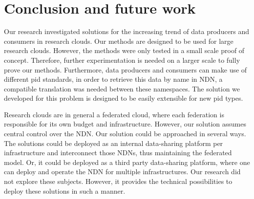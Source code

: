\section{Conclusion and future work}
\label{fut}
\label{conc}












Our research investigated solutions for the increasing trend of data producers and consumers in research clouds. Our methods are designed to be used for large research clouds. However, the methods were only tested in a small scale proof of concept. Therefore, further experimentation is needed on a larger scale to fully prove our methods. Furthermore, data producers and consumers can make use of different \gls{pid} standards, in order to retrieve this data by name in NDN, a compatible translation was needed between these namespaces. The solution we developed for this problem is designed to be easily extensible for new \gls{pid} types. 

Research clouds are in general a federated cloud, where each federation is responsible for its own budget and infrastructure. However, our solution assumes central control over the NDN. Our solution could be approached in several ways. The solutions could be deployed as an internal data-sharing platform per infrastructure and interconnect those NDNs, thus maintaining the federated model. Or, it could be deployed as a third party data-sharing platform, where one can deploy and operate the NDN for multiple infrastructures. Our research did not explore these subjects. However, it provides the technical possibilities to deploy these solutions in such a manner.

